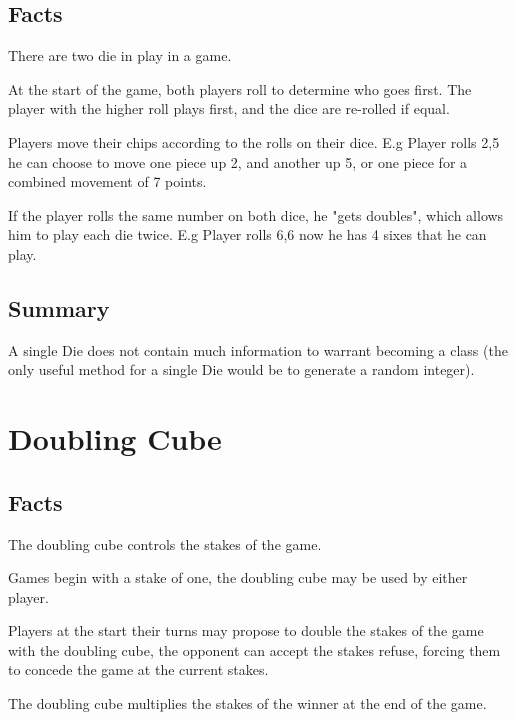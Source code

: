 \documentclass{report}
\begin{document}
\subsection{Facts}

\begin{dashed}
    \item There are two die in play in a game.
    \item At the start of the game, both players roll to determine who goes first.
The player with the higher roll plays first, and the dice are re-rolled if equal.
    \item Players move their chips according to the rolls on their dice.
        E.g Player rolls 2,5 he can choose to move one piece up 2, and another up 5,
        or one piece for a combined movement of 7 points.
    \item If the player rolls the same number on both dice, he "gets doubles", which
        allows him to play each die twice.
        E.g Player rolls 6,6 now he has 4 sixes that he can play.

\end{dashed}

\subsection{Summary}

A single Die does not contain much information to warrant becoming a class (the
only useful method for a single Die would be to generate a random integer).

\section{Doubling Cube}

\subsection{Facts}

\begin{dashed}
    \item The doubling cube controls the stakes of the game.
    \item Games begin with a stake of one, the doubling cube may be used by either player.
    \item Players at the start their turns may propose to double the stakes of the game
        with the doubling cube, the opponent can accept the stakes refuse, forcing them
        to concede the game at the current stakes.
    \item The doubling cube multiplies the stakes of the winner at the end of the game.
\end{dashed}
\end{document}
